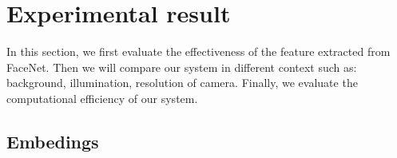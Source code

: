 \documentclass[journal, twocolumn]{IEEEtran}
\begin{document}
\medskip
\section{Experimental result}
\label{experimental-result}


In this section, we first evaluate the effectiveness of the feature extracted from FaceNet. Then we will compare our system in different context such as: background, illumination, resolution of camera. Finally, we evaluate the computational efficiency of our system.


\subsection{Embedings} 
\end{document}

